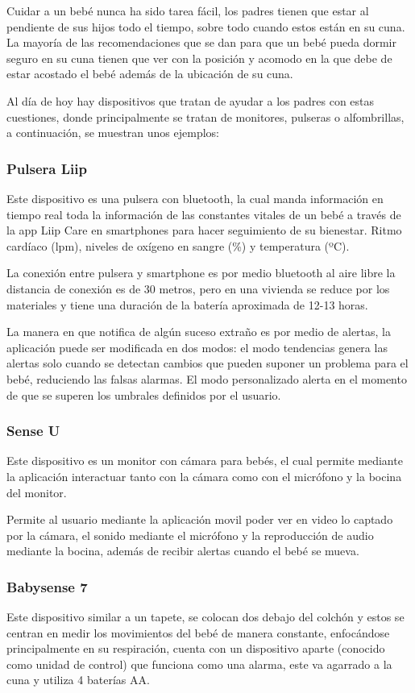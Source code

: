 Cuidar a un bebé nunca ha sido tarea fácil, los padres tienen que estar al pendiente de sus hijos todo el tiempo, sobre todo cuando estos están en su cuna. La mayoría de las recomendaciones que se dan para que un bebé pueda dormir seguro en su cuna tienen que ver con la posición y acomodo en la que debe de estar acostado el bebé además de la ubicación de su cuna.

Al día de hoy hay dispositivos que tratan de ayudar a los padres con estas cuestiones, donde principalmente se tratan de monitores, pulseras o alfombrillas, a continuación, se muestran unos ejemplos:

\subsubsection{Pulsera Liip}
Este dispositivo es una pulsera con bluetooth, la cual manda información en tiempo real toda la información de las constantes vitales de un bebé a través de la app Liip Care en smartphones para hacer seguimiento de su bienestar. Ritmo cardíaco (lpm), niveles de oxígeno en sangre (\%) y temperatura (ºC).

La conexión entre pulsera y smartphone es por medio bluetooth al aire libre la distancia de conexión es de 30 metros, pero en una vivienda se reduce por los materiales y tiene una duración de la batería aproximada de 12-13 horas.

La manera en que notifica de algún suceso extraño es por medio de alertas, la aplicación puede ser modificada en dos modos: el modo tendencias genera las alertas solo cuando se detectan cambios que pueden suponer un problema para el bebé, reduciendo las falsas alarmas. El modo personalizado alerta en el momento de que se superen los umbrales definidos por el usuario.

\subsubsection{Sense U}
Este dispositivo es un monitor con cámara para bebés, el cual permite mediante la aplicación interactuar tanto con la cámara como con el micrófono y la bocina del monitor.

Permite al usuario mediante la aplicación movil poder ver en video lo captado por la cámara, el sonido mediante el micrófono y la reproducción de audio mediante la bocina, además de recibir alertas cuando el bebé se mueva.

\subsubsection{Babysense 7}
Este dispositivo similar a un tapete, se colocan dos debajo del colchón y estos se centran en medir los movimientos del bebé de manera constante, enfocándose principalmente en su respiración, cuenta con un dispositivo aparte (conocido como unidad de control) que funciona como una alarma, este va agarrado a la cuna y utiliza 4 baterías AA.

